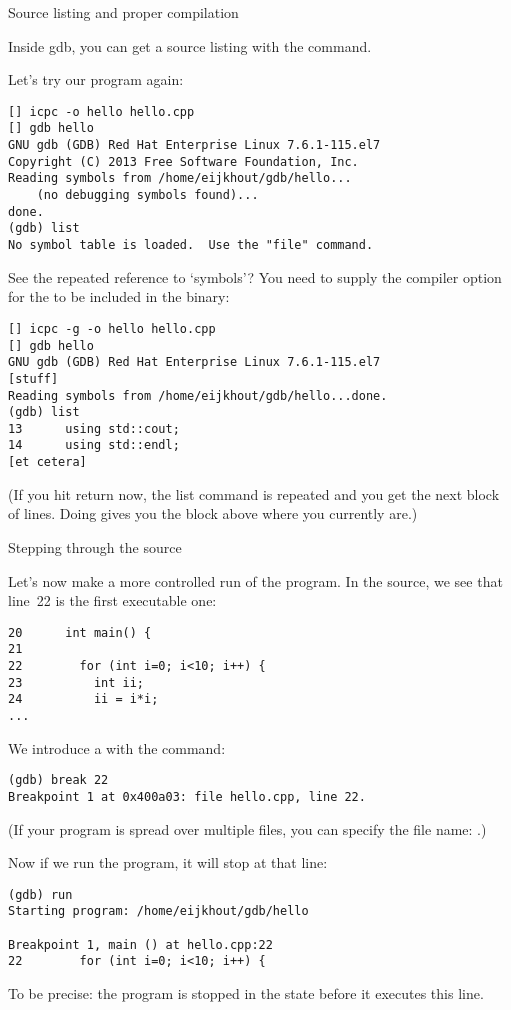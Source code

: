  {Source listing and proper compilation}

Inside gdb, you can get a source listing with the  command.

Let's try our program again:
\begin{verbatim}
[] icpc -o hello hello.cpp
[] gdb hello
GNU gdb (GDB) Red Hat Enterprise Linux 7.6.1-115.el7
Copyright (C) 2013 Free Software Foundation, Inc.
Reading symbols from /home/eijkhout/gdb/hello...
    (no debugging symbols found)...
done.
(gdb) list
No symbol table is loaded.  Use the "file" command.
\end{verbatim}

See the repeated reference to `symbols'?
You need to supply the  compiler option for the 
to be included in the binary:
\begin{verbatim}
[] icpc -g -o hello hello.cpp
[] gdb hello
GNU gdb (GDB) Red Hat Enterprise Linux 7.6.1-115.el7
[stuff]
Reading symbols from /home/eijkhout/gdb/hello...done.
(gdb) list
13      using std::cout;
14      using std::endl;
[et cetera]
\end{verbatim}
(If you hit return now, the list command is repeated and you get the next block of lines.
Doing  gives you the block above where you currently are.)

 {Stepping through the source}

Let's now make a more controlled run of the program.
In the source, we see that line~22 is the first executable one:
\begin{lstlisting}
20      int main() {
21
22        for (int i=0; i<10; i++) {
23          int ii;
24          ii = i*i;
...
\end{lstlisting}

We introduce a  with the  command:
\begin{verbatim}
(gdb) break 22
Breakpoint 1 at 0x400a03: file hello.cpp, line 22.
\end{verbatim}
(If your program is spread over multiple files,
you can specify the file name: .)

Now if we run the program, it will stop at that line:
\begin{verbatim}
(gdb) run
Starting program: /home/eijkhout/gdb/hello

Breakpoint 1, main () at hello.cpp:22
22        for (int i=0; i<10; i++) {
\end{verbatim}
To be precise: the program is stopped in the state before it executes this line.

